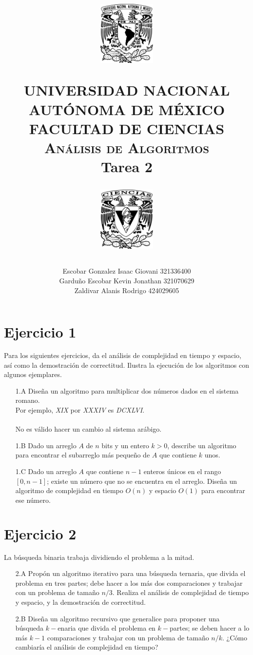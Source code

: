 \documentclass[12pt]{article}
\title{
		\vspace{-0.7in} 	
		\usefont{OT1}{bch}{b}{n}
		\begin{minipage}{3cm}
        \vspace{-0.5in} 	
    	\begin{center}
    		\includegraphics[height=3.2cm]{logo_unam.png}
    	\end{center}
    \end{minipage}\hfill
    \begin{minipage}{10.7cm}
    
    	\begin{center}
\normalfont \normalsize \textsc{UNIVERSIDAD NACIONAL AUTÓNOMA DE MÉXICO \\ FACULTAD DE CIENCIAS \\ Análisis de Algoritmos } \\
		\huge Tarea 2
    	\end{center}
     
    \end{minipage}\hfill
    \begin{minipage}{3.2cm}
    \vspace{-0.5in} 
    	\begin{center}
    		\includegraphics[height=3.2cm]{logo_fc.png}
    	\end{center}
    \end{minipage}

\author{Escobar Gonzalez Isaac Giovani \hspace{1cm} 321336400\\
        Garduño Escobar Kevin Jonathan \hspace{0.5cm} 321070629\\
        Zaldivar Alanis Rodrigo \hspace{2.75cm} 424029605 }
\date{}
}
\begin{document}
\maketitle

\section*{Ejercicio 1}
Para los siguientes ejercicios, da el análisis de complejidad en tiempo y espacio, así como la demostración de correctitud. Ilustra la ejecución de los algoritmos con algunos ejemplares.
\begin{itemize}
    \item[1.A] Diseña un algoritmo para multiplicar dos números dados en el sistema romano.\\
    Por ejemplo, \textit{XIX} por \textit{XXXIV} es \textit{DCXLVI}.\\\\
    No es válido hacer un cambio al sistema arábigo.
    \item[1.B] Dado un arreglo $A$ de $n$ bits y un entero $k > 0$, describe un algoritmo para encontrar el subarreglo más pequeño de $A$ que contiene $k$ unos.
    \item[1.C] Dado un arreglo $A$ que contiene $n - 1$ enteros  únicos en el rango $[0, n - 1]$; existe un número que no se encuentra en el arreglo. Diseña un algoritmo de complejidad en tiempo $O(n)$ y espacio $O(1)$ para encontrar ese número.
\end{itemize}

\section*{Ejercicio 2}
La búsqueda binaria trabaja dividiendo el problema a la mitad.
\begin{itemize}
    \item[2.A] Propón un algoritmo iterativo para una búsqueda ternaria, que divida el problema en tres partes; debe hacer a los más dos comparaciones y trabajar con un problema de tamaño $n/3$. Realiza el análisis de complejidad de tiempo y espacio, y la demostración de correctitud.
    \item[2.B] Diseña un algoritmo recursivo que generalice para proponer una búsqueda $k-$enaria que divida el problema en $k-$partes; se deben hacer a lo más $k - 1$ comparaciones y trabajar con un problema de tamaño $n/k$. ¿Cómo cambiaría el análisis de complejidad en tiempo?
\end{itemize}
\end{document}
